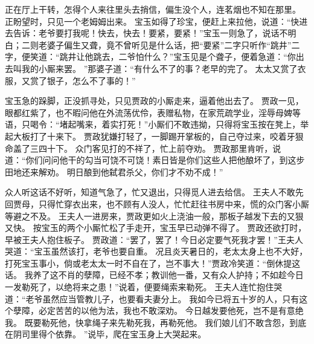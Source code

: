 正在厅上干转，怎得个人来往里头去捎信，偏生没个人，连茗烟也不知在那里。
正盼望时，只见一个老姆姆出来。
宝玉如得了珍宝，便赶上来拉他，说道：“快进去告诉：老爷要打我呢！快去，快去！要紧，要紧！”宝玉一则急了，说话不明白；二则老婆子偏生又聋，竟不曾听见是什么话，把“要紧”二字只听作“跳井”二字，便笑道：“跳井让他跳去，二爷怕什么？”宝玉见是个聋子，便着急道：“你出去叫我的小厮来罢。
”那婆子道：“有什么不了的事？老早的完了。
太太又赏了衣服，又赏了银子，怎么不了事的！”\par
宝玉急的跺脚，正没抓寻处，只见贾政的小厮走来，逼着他出去了。
贾政一见，眼都红紫了，也不暇问他在外流荡优伶，表赠私物，在家荒疏学业，淫辱母婢等语，只喝令：“堵起嘴来，着实打死！”小厮们不敢违拗，只得将宝玉按在凳上，举起大板打了十来下。
贾政犹嫌打轻了，一脚踢开掌板的，自己夺过来，咬着牙狠命盖了三四十下。
众门客见打的不祥了，忙上前夺劝。
贾政那里肯听，说道：“你们问问他干的勾当可饶不可饶！素日皆是你们这些人把他酿坏了，到这步田地还来解劝。
明日酿到他弑君杀父，你们才不劝不成！”\par
众人听这话不好听，知道气急了，忙又退出，只得觅人进去给信。
王夫人不敢先回贾母，只得忙穿衣出来，也不顾有人没人，忙忙赶往书房中来，慌的众门客小厮等避之不及。
王夫人一进房来，贾政更如火上浇油一般，那板子越发下去的又狠又快。
按宝玉的两个小厮忙松了手走开，宝玉早已动弹不得了。
贾政还欲打时，早被王夫人抱住板子。
贾政道：“罢了，罢了！今日必定要气死我才罢！”王夫人哭道：“宝玉虽然该打，老爷也要自重。
况且炎天暑日的，老太太身上也不大好，打死宝玉事小，倘或老太太一时不自在了，岂不事大！”贾政冷笑道：“倒休提这话。
我养了这不肖的孽障，已经不孝；教训他一番，又有众人护持；不如趁今日一发勒死了，以绝将来之患！”说着，便要绳索来勒死。
王夫人连忙抱住哭道：“老爷虽然应当管教儿子，也要看夫妻分上。
我如今已将五十岁的人，只有这个孽障，必定苦苦的以他为法，我也不敢深劝。
今日越发要他死，岂不是有意绝我。
既要勒死他，快拿绳子来先勒死我，再勒死他。
我们娘儿们不敢含怨，到底在阴司里得个依靠。
 ”说毕，爬在宝玉身上大哭起来。
